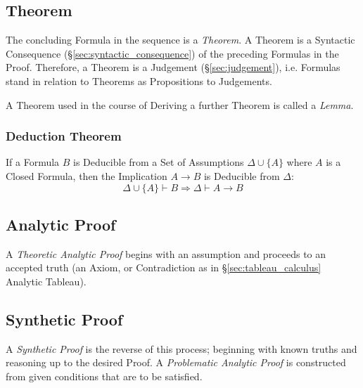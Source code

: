 \subsection{Theorem}\label{sec:theorem}

The concluding Formula in the sequence is a \emph{Theorem}. A Theorem
is a Syntactic Consequence (\S\ref{sec:syntactic_consequence}) of the
preceding Formulas in the Proof. Therefore, a Theorem is a Judgement
(\S\ref{sec:judgement}), i.e. Formulas stand in relation to Theorems
as Propositions to Judgements. \cite{martinlof84}

A Theorem used in the course of Deriving a further Theorem is called a
\emph{Lemma}.



\subsubsection{Deduction Theorem}\label{sec:deduction_theorem}

If a Formula $B$ is Deducible from a Set of Assumptions $\Delta \cup
\{ A \}$ where $A$ is a Closed Formula, then the Implication $A
\rightarrow B$ is Deducible from $\Delta$:
\[
  \Delta \cup \{A\} \vdash B \Rightarrow \Delta \vdash A \rightarrow B
\]



\subsection{Analytic Proof}\label{sec:analytic_proof}

A \emph{Theoretic Analytic Proof} begins with an assumption and
proceeds to an accepted truth (an Axiom, or Contradiction as in
\S\ref{sec:tableau_calculus} Analytic Tableau).



\subsection{Synthetic Proof}\label{sec:synthetic_proof}

A \emph{Synthetic Proof} is the reverse of this process; beginning
with known truths and reasoning up to the desired Proof. A
\emph{Problematic Analytic Proof} is constructed from given conditions
that are to be satisfied.



